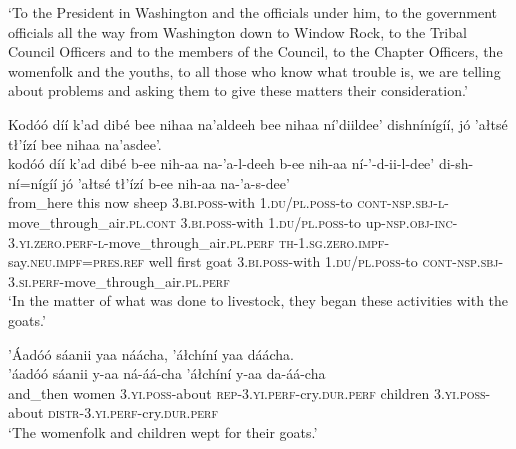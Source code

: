 \glt `To the President in Washington and the officials under him, to the government officials all the way from Washington down to Window Rock, to the Tribal Council Officers and to the members of the Council, to the Chapter Officers, the womenfolk and the youths, to all those who know what trouble is, we are telling about problems and asking them to give these matters their consideration.'
\z

\ea\label{ex:text7-2-1}
Kodóó díí k’ad dibé bee nihaa na’aldeeh bee nihaa ní’diildee’ dishnínígíí, jó ’ałtsé tł’ízí bee nihaa na’asdee’.\\
\gll kodóó	díí	k’ad	dibé	b-ee	nih-aa	na-’a-l-deeh	b-ee	nih-aa	ní-’-d-ii-l-dee’	di-sh-ní=nígíí	jó	’ałtsé	tł’ízí	b-ee	nih-aa	na-’a-s-dee’\\
     from\_here	this	now	sheep	3.\textsc{bi}.\textsc{poss}-with	1.\textsc{du}/\textsc{pl}.\textsc{poss}-to	\textsc{cont}-\textsc{nsp}.\textsc{sbj}-\textsc{l}-move\_through\_air.\textsc{pl}.\textsc{cont}	3.\textsc{bi}.\textsc{poss}-with	1.\textsc{du}/\textsc{pl}.\textsc{poss}-to	up-\textsc{nsp}.\textsc{obj}-\textsc{inc}-3.\textsc{yi}.\textsc{zero}.\textsc{perf}-\textsc{l}-move\_through\_air.\textsc{pl}.\textsc{perf}	\textsc{th}-1.\textsc{sg}.\textsc{zero}.\textsc{impf}-say.\textsc{neu}.\textsc{impf}=\textsc{pres}.\textsc{ref}	well	first	goat	3.\textsc{bi}.\textsc{poss}-with	1.\textsc{du}/\textsc{pl}.\textsc{poss}-to	\textsc{cont}-\textsc{nsp}.\textsc{sbj}-3.\textsc{si}.\textsc{perf}-move\_through\_air.\textsc{pl}.\textsc{perf}\\
\glt `In the matter of what was done to livestock, they began these activities with the goats.'
\z

\ea\label{ex:text7-2-2}
’Áadóó sáanii yaa náácha, ’áłchíní yaa dáácha.\\
\gll ’áadóó	sáanii	y-aa	ná-áá-cha	’áłchíní	y-aa	da-áá-cha\\
     and\_then	women	3.\textsc{yi}.\textsc{poss}-about	\textsc{rep}-3.\textsc{yi}.\textsc{perf}-cry.\textsc{dur}.\textsc{perf}	children	3.\textsc{yi}.\textsc{poss}-about	\textsc{distr}-3.\textsc{yi}.\textsc{perf}-cry.\textsc{dur}.\textsc{perf}\\
\glt `The womenfolk and children wept for their goats.'
\z

